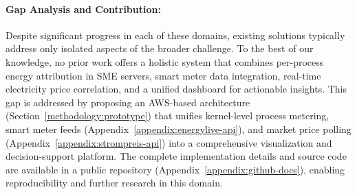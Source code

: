 \paragraph{\textbf{Gap Analysis and Contribution:}}
Despite significant progress in each of these domains, existing solutions typically address only isolated aspects of the broader challenge. To the best of our knowledge, no prior work offers a holistic system that combines per-process energy attribution in SME servers, smart meter data integration, real-time electricity price correlation, and a unified dashboard for actionable insights. This gap is addressed by proposing an AWS-based architecture (Section~\ref{methodology:prototype}) that unifies kernel-level process metering, smart meter feeds (Appendix~\ref{appendix:energylive-api}), and market price polling (Appendix~\ref{appendix:strompreis-api}) into a comprehensive visualization and decision-support platform. The complete implementation details and source code are available in a public repository (Appendix~\ref{appendix:github-docs}), enabling reproducibility and further research in this domain.